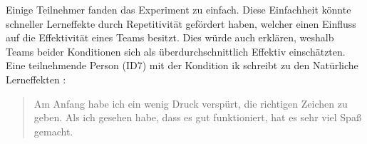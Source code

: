 \documentclass[a4paper,11pt]{article}%
\renewcommand{\\}{\vspace*{0.5\baselineskip} \newline}
\begin{document}
Einige Teilnehmer fanden das Experiment zu einfach. Diese Einfachheit könnte schneller Lerneffekte durch Repetitivität gefördert haben, welcher einen Einfluss auf die Effektivität eines Teams besitzt. Dies würde auch erklären, weshalb Teams beider Konditionen sich als überdurchschnittlich Effektiv einschätzten.
Eine teilnehmende Person (ID7) mit der Kondition \ac{ik} schreibt zu den Natürliche Lerneffekten :
\begin{quote}
\glqq{}Am Anfang habe ich ein wenig Druck verspürt, die richtigen Zeichen zu geben. Als ich gesehen habe, dass es gut funktioniert, hat es sehr viel Spaß gemacht.\dq{}
\end{quote}
%
%
\end{document}
